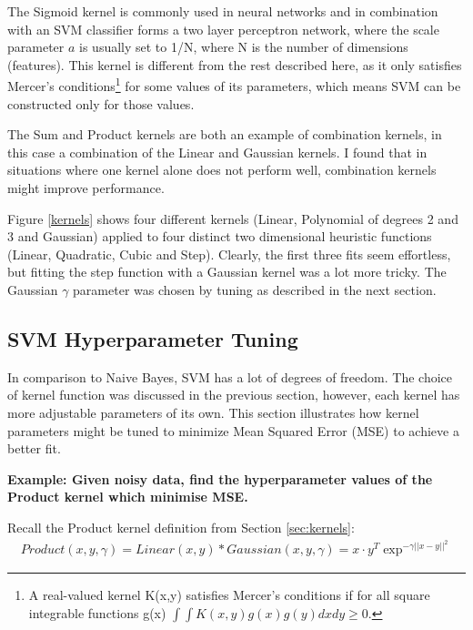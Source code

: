 \documentclass[12pt,a4paper,notitlepage,twoside]{scrbook}
\begin{document}
The Sigmoid kernel is commonly used in neural networks
and in combination with an SVM classifier forms a two layer perceptron network,
where the scale parameter \(a\) is usually set to 1/N, where N is the number of
dimensions (features)\cite{sigmoid}. This kernel is different from the rest described
here, as it only satisfies Mercer's conditions\footnote{A real-valued kernel K(x,y) satisfies
Mercer's conditions if for all square integrable functions g(x) \(\int\int
K(x,y)g(x)g(y)dxdy\geq 0.\)} for some values of its parameters, which
	means SVM can be constructed only for those values\cite{stat_learn}.

The Sum and Product kernels are both an example of combination kernels, in this case a
combination of the Linear and Gaussian kernels. I found that in situations
where one kernel alone does not perform well, combination kernels might improve performance.

Figure \ref{kernels} shows four different kernels (Linear, Polynomial of degrees 2 and 3
and Gaussian) applied to four distinct two dimensional heuristic functions (Linear, Quadratic,
Cubic and Step). Clearly, the first three fits seem effortless, but fitting the step
function with a Gaussian kernel was a lot more tricky. The Gaussian $\gamma$ parameter was chosen
by tuning as described in the next section.
\subsection{SVM Hyperparameter Tuning}
\label{sec:tuning}
In comparison to Naive Bayes, SVM has a lot of degrees of freedom. The choice
of kernel function was discussed in the previous section, however, each kernel has more
adjustable parameters of its own. This section illustrates how kernel
parameters might be tuned to minimize Mean Squared Error (MSE) to achieve a better fit.

\textbf{Example: Given noisy data, find the hyperparameter values of the Product kernel
which minimise MSE.}

Recall the Product kernel definition from Section \ref{sec:kernels}: 
\begin{gather*}
Product(x,y,\gamma) = Linear(x,y)*Gaussian(x,y,\gamma) = x\cdot y^T \exp^{-\gamma ||x-y||^2}
\end{gather*}
\end{document}

